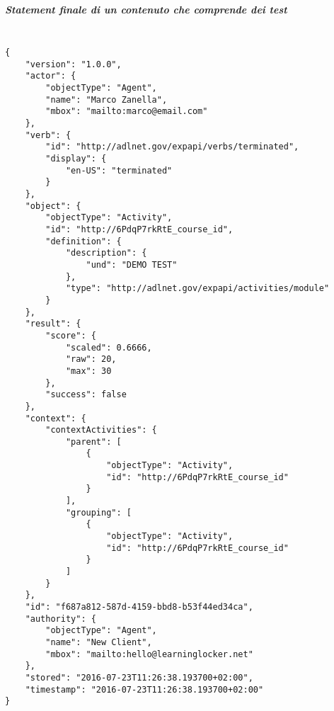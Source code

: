     \subparagraph*{Statement finale di un contenuto che comprende dei test\\\\}
    \begin{lstlisting}
{
    "version": "1.0.0",
    "actor": {
        "objectType": "Agent",
        "name": "Marco Zanella",
        "mbox": "mailto:marco@email.com"
    },
    "verb": {
        "id": "http://adlnet.gov/expapi/verbs/terminated",
        "display": {
            "en-US": "terminated"
        }
    },
    "object": {
        "objectType": "Activity",
        "id": "http://6PdqP7rkRtE_course_id",
        "definition": {
            "description": {
                "und": "DEMO TEST"
            },
            "type": "http://adlnet.gov/expapi/activities/module"
        }
    },
    "result": {
        "score": {
            "scaled": 0.6666,
            "raw": 20,
            "max": 30
        },
        "success": false
    },
    "context": {
        "contextActivities": {
            "parent": [
                {
                    "objectType": "Activity",
                    "id": "http://6PdqP7rkRtE_course_id"
                }
            ],
            "grouping": [
                {
                    "objectType": "Activity",
                    "id": "http://6PdqP7rkRtE_course_id"
                }
            ]
        }
    },
    "id": "f687a812-587d-4159-bbd8-b53f44ed34ca",
    "authority": {
        "objectType": "Agent",
        "name": "New Client",
        "mbox": "mailto:hello@learninglocker.net"
    },
    "stored": "2016-07-23T11:26:38.193700+02:00",
    "timestamp": "2016-07-23T11:26:38.193700+02:00"
}
    \end{lstlisting}